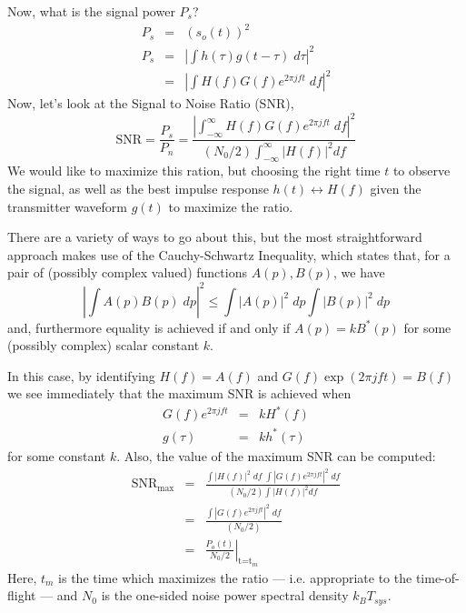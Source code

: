 Now, what is the signal power $P_s$?
\begin{eqnarray}
P_s &=& (s_o(t))^2 \\
P_s &=& \left| \int h(\tau) g(t-\tau) \; d\tau \right|^2 \\
    &=& \left| \int H(f) G(f) e^{2\pi j f t} \; df \right|^2
\end{eqnarray}
Now, let's look at the Signal to Noise Ratio (SNR),
\begin{equation}
\textrm{SNR} = \frac{P_s}{P_n} = 
\frac{\left| \int_{-\infty}^\infty H(f) G(f) e^{2\pi j f t} \; df \right|^2}
      {(N_0/2)  \int_{-\infty}^\infty \left| H(f) \right|^2 df}
\end{equation}
We would like to maximize this ration, but choosing the right time
$t$ to observe the signal, as well as the best impulse response
$h(t) \leftrightarrow H(f)$ given the transmitter waveform $g(t)$ to
maximize the ratio.  

There are a variety of ways to go about this, but the most
straightforward approach makes use of the Cauchy-Schwartz
Inequality, which states that, for a
pair of (possibly complex valued) functions $A(p), B(p)$, we have
\begin{equation}
\left|\int A(p) B(p) \; dp \right|^2 \le \int |A(p)|^2 \; dp \int |B(p)|^2\; dp
\end{equation}
and, furthermore equality is achieved if and only if $A(p) =
kB^\ast(p)$ for some (possibly complex) scalar constant $k$.

In this case, by identifying $H(f) = A(f)$ and
$G(f)\exp(2\pi j f t) = B(f)$ we see immediately that the maximum SNR
is achieved when
\begin{eqnarray}
G(f) e^{2\pi j f t} &=& kH^\ast(f) \\
g(\tau) &=& kh^\ast(\tau)
\end{eqnarray}
for some constant $k$.  Also, the value of the maximum SNR can be
computed:
\begin{eqnarray}
\textrm{SNR}_{\textrm{max}} &=& 
  \frac{\int |H(f)|^2\; df  \; \int |G(f) e^{2\pi j f t}|^2 \; df}
      {(N_0/2)  \int\left| H(f) \right|^2 df} \\
  &=& \frac{\int |G(f) e^{2\pi j f t}|^2 \; df}{(N_0/2)} \\
  &=& \left. \frac{P_o(t)}{N_0/2} \right|_{\textrm{t=t}_m}
\end{eqnarray}
Here, $t_m$ is the time which maximizes the ratio ---
i.e. appropriate to the time-of-flight --- and $N_0$ is the one-sided
noise power spectral density $k_B T_{sys}$.

